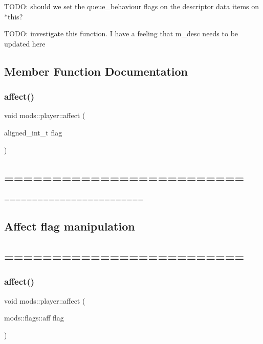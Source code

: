 T\+O\+DO\+: should we set the queue\+\_\+behaviour flags on the descriptor data items on $\ast$this?

T\+O\+DO\+: investigate this function. I have a feeling that m\+\_\+desc needs to be updated here 

\subsection{Member Function Documentation}
\mbox{\label{classmods_1_1player_a5af5ab2621df94bc867bc56ab37b0099}} 
\subsubsection{\texorpdfstring{affect()}{affect()}\hspace{0.1cm}{\footnotesize\ttfamily [1/2]}}
{\footnotesize\ttfamily void mods\+::player\+::affect (\begin{DoxyParamCaption}\item[{aligned\+\_\+int\+\_\+t}]{flag }\end{DoxyParamCaption})}

\subsection*{========================= }

========================= \subsection*{Affect flag manipulation }

\subsection*{========================= }\mbox{\label{classmods_1_1player_a47a34f3be04cad723e561028c7ae24cd}} 
\subsubsection{\texorpdfstring{affect()}{affect()}\hspace{0.1cm}{\footnotesize\ttfamily [2/2]}}
{\footnotesize\ttfamily void mods\+::player\+::affect (\begin{DoxyParamCaption}\item[{mods\+::flags\+::aff}]{flag }\end{DoxyParamCaption})}

